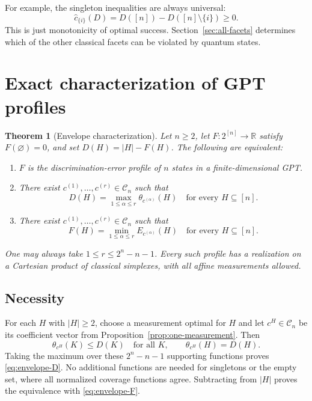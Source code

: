 \documentclass[a4paper,11pt,onecolumn,unpublished]{quantumarticle}
\newtheorem{theorem}{Theorem}[section]
\theoremstyle{definition}
\newcommand{\R}{\mathbb R}
\newcommand{\1}{\mathbf 1}
\newcommand{\Coeff}{\mathcal C}
\begin{document}
For example, the singleton inequalities are always universal:
\begin{equation}\label{eq:singleton-universal}
 \widehat c_{\{i\}}(D)=D([n])-D([n]\setminus\{i\})\ge0.
\end{equation}
This is just monotonicity of optimal success. Section~\ref{sec:all-facets}
determines which of the other classical facets can be violated by quantum
states.

\section{Exact characterization of GPT profiles}\label{sec:envelope}

\begin{theorem}[Envelope characterization]\label{thm:envelope}
Let $n\ge2$, let $F:2^{[n]}\to\R$ satisfy $F(\varnothing)=0$, and set
$D(H)=|H|-F(H)$. The following are equivalent:
\begin{enumerate}[label=(\roman*)]
\item $F$ is the discrimination-error profile of $n$ states in a
finite-dimensional GPT.
\item There exist $c^{(1)},\ldots,c^{(r)}\in\Coeff_n$ such that
\begin{equation}\label{eq:envelope-D}
 D(H)=\max_{1\le\alpha\le r}\theta_{c^{(\alpha)}}(H)
 \quad\text{for every }H\subseteq[n].
\end{equation}
\item There exist $c^{(1)},\ldots,c^{(r)}\in\Coeff_n$ such that
\begin{equation}\label{eq:envelope-F}
 F(H)=\min_{1\le\alpha\le r}E_{c^{(\alpha)}}(H)
 \quad\text{for every }H\subseteq[n].
\end{equation}
\end{enumerate}
One may always take $1\le r\le2^n-n-1$. Every such profile has a realization
on a Cartesian product of classical simplexes, with all affine measurements
allowed.
\end{theorem}

\subsection{Necessity}

For each $H$ with $|H|\ge2$, choose a measurement optimal for $H$ and let
$c^H\in\Coeff_n$ be its coefficient vector from
Proposition~\ref{prop:one-measurement}. Then
\[
 \theta_{c^H}(K)\le D(K)\quad\text{for all }K,
 \qquad\theta_{c^H}(H)=D(H).
\]
Taking the maximum over these $2^n-n-1$ supporting functions proves
\eqref{eq:envelope-D}. No additional functions are needed for singletons or the
empty set, where all normalized coverage functions agree. Subtracting from
$|H|$ proves the equivalence with \eqref{eq:envelope-F}.
\end{document}
